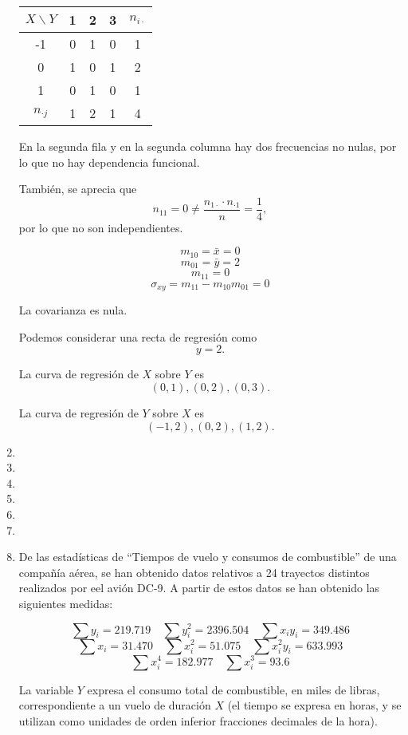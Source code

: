 \documentclass[10pt,a4paper]{article}
\begin{document}
\begin{enumerate}
\bigskip

\begin{center}
\begin{tabular}{c|ccc|c}
$X \backslash Y$ & 1 & 2 & 3 & $n_{i\cdot}$\\\hline
-1 & 0 & 1 & 0 & 1 \\
0 & 1 & 0 & 1 & 2 \\
1 & 0 & 1 & 0 & 1 \\\hline
$n_{\cdot j}$ & 1 & 2 & 1 & 4 \\
\end{tabular}
\end{center}

En la segunda fila y en la segunda columna hay dos frecuencias no nulas, por lo que no hay dependencia funcional.

También, se aprecia que $$n_{11} = 0 \not = \frac{n_{1\cdot}\cdot n_{\cdot 1}}{n} = \frac{1}{4},$$ por lo que no son independientes.

$$m_{10} = \bar x = 0$$
$$m_{01} = \bar y = 2$$
$$m_{11} = 0$$
$$\sigma_{xy} = m_{11} - m_{10}m_{01} = 0$$

La covarianza es nula.

Podemos considerar una recta de regresión como $$y = 2.$$

La curva de regresión de $X$ sobre $Y$ es $$(0,1), (0,2), (0,3).$$

La curva de regresión de $Y$ sobre $X$ es $$(-1,2), (0,2), (1,2).$$

\newpage
\item
\newpage
\item
\newpage
\item
\newpage
\item
\newpage
\item
\newpage
\item
\newpage


        \item De las estadísticas de ``Tiempos de vuelo y consumos de combustible'' de una compañía aérea, se han obtenido datos relativos a 24 trayectos distintos realizados por eel avión DC-9. A partir de estos datos se han obtenido las siguientes medidas:
            \begin{center}
                \[
                \sum y_i = 219.719 \quad  \sum y_i^2 = 2396.504 \quad \sum x_i y_i = 349.486
                \]
                \[
                \sum x_i = 31.470 \quad \sum x_i^2 = 51.075 \quad \sum x_i^2 y_i = 633.993
                \]
                \[
                \sum x_i^4 = 182.977 \quad \sum x_i^3 = 93.6
                \]
            \end{center}
            La variable \(Y\) expresa el consumo total de combustible, en miles de libras, correspondiente a un vuelo de duración \(X\) (el tiempo se expresa en horas, y se utilizan como unidades de orden inferior fracciones decimales de la hora).


\end{enumerate}
\end{document}
